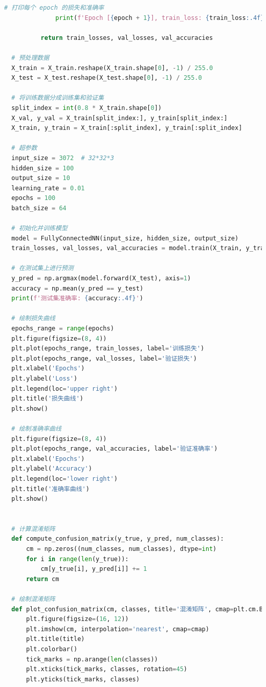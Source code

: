 \documentclass[12pt]{article}
\begin{document}
\begin{lstlisting}[language=Python]
              # 打印每个 epoch 的损失和准确率
              print(f'Epoch [{epoch + 1}], train_loss: {train_loss:.4f}, val_loss: {val_loss:.4f}, val_acc: {val_accuracy:.4f}')
          
          return train_losses, val_losses, val_accuracies
  
  # 预处理数据
  X_train = X_train.reshape(X_train.shape[0], -1) / 255.0
  X_test = X_test.reshape(X_test.shape[0], -1) / 255.0
  
  # 将训练数据分成训练集和验证集
  split_index = int(0.8 * X_train.shape[0])
  X_val, y_val = X_train[split_index:], y_train[split_index:]
  X_train, y_train = X_train[:split_index], y_train[:split_index]
  
  # 超参数
  input_size = 3072  # 32*32*3
  hidden_size = 100
  output_size = 10
  learning_rate = 0.01
  epochs = 100
  batch_size = 64
  
  # 初始化并训练模型
  model = FullyConnectedNN(input_size, hidden_size, output_size)
  train_losses, val_losses, val_accuracies = model.train(X_train, y_train, X_val, y_val, epochs, learning_rate)
  
  # 在测试集上进行预测
  y_pred = np.argmax(model.forward(X_test), axis=1)
  accuracy = np.mean(y_pred == y_test)
  print(f'测试集准确率: {accuracy:.4f}')
  
  # 绘制损失曲线
  epochs_range = range(epochs)
  plt.figure(figsize=(8, 4))
  plt.plot(epochs_range, train_losses, label='训练损失')
  plt.plot(epochs_range, val_losses, label='验证损失')
  plt.xlabel('Epochs')
  plt.ylabel('Loss')
  plt.legend(loc='upper right')
  plt.title('损失曲线')
  plt.show()
  
  # 绘制准确率曲线
  plt.figure(figsize=(8, 4))
  plt.plot(epochs_range, val_accuracies, label='验证准确率')
  plt.xlabel('Epochs')
  plt.ylabel('Accuracy')
  plt.legend(loc='lower right')
  plt.title('准确率曲线')
  plt.show()
  
  
  # 计算混淆矩阵
  def compute_confusion_matrix(y_true, y_pred, num_classes):
      cm = np.zeros((num_classes, num_classes), dtype=int)
      for i in range(len(y_true)):
          cm[y_true[i], y_pred[i]] += 1
      return cm
  
  # 绘制混淆矩阵
  def plot_confusion_matrix(cm, classes, title='混淆矩阵', cmap=plt.cm.Blues):
      plt.figure(figsize=(16, 12))
      plt.imshow(cm, interpolation='nearest', cmap=cmap)
      plt.title(title)
      plt.colorbar()
      tick_marks = np.arange(len(classes))
      plt.xticks(tick_marks, classes, rotation=45)
      plt.yticks(tick_marks, classes)
  

\end{lstlisting}
\end{document}

